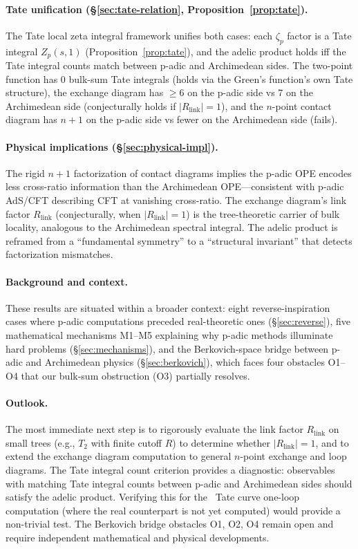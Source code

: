 \documentclass[11pt,a4paper]{article}
\begin{document}
\paragraph{Tate unification (\S\ref{sec:tate-relation}, Proposition~\ref{prop:tate}).}
The Tate local zeta integral framework unifies both cases: each $\zeta_p$ factor is a Tate integral $Z_p(s, 1)$ (Proposition~\ref{prop:tate}), and the adelic product holds iff the Tate integral counts match between p-adic and Archimedean sides. The two-point function has 0 bulk-sum Tate integrals (holds via the Green's function's own Tate structure), the exchange diagram has $\geq 6$ on the p-adic side vs 7 on the Archimedean side (conjecturally holds if $|R_{\mathrm{link}}| = 1$), and the $n$-point contact diagram has $n{+}1$ on the p-adic side vs fewer on the Archimedean side (fails).

\paragraph{Physical implications (\S\ref{sec:physical-impl}).}
The rigid $n{+}1$ factorization of contact diagrams implies the p-adic OPE encodes less cross-ratio information than the Archimedean OPE---consistent with p-adic AdS/CFT describing CFT at vanishing cross-ratio. The exchange diagram's link factor $R_{\mathrm{link}}$ (conjecturally, when $|R_{\mathrm{link}}| = 1$) is the tree-theoretic carrier of bulk locality, analogous to the Archimedean spectral integral. The adelic product is reframed from a ``fundamental symmetry'' to a ``structural invariant'' that detects factorization mismatches.

\paragraph{Background and context.}
These results are situated within a broader context: eight reverse-inspiration cases where p-adic computations preceded real-theoretic ones (\S\ref{sec:reverse}), five mathematical mechanisms M1--M5 explaining why p-adic methods illuminate hard problems (\S\ref{sec:mechanisms}), and the Berkovich-space bridge between p-adic and Archimedean physics (\S\ref{sec:berkovich}), which faces four obstacles O1--O4 that our bulk-sum obstruction (O3) partially resolves.

\paragraph{Outlook.}
The most immediate next step is to rigorously evaluate the link factor $R_{\mathrm{link}}$ on small trees (e.g., $T_2$ with finite cutoff $R$) to determine whether $|R_{\mathrm{link}}| = 1$, and to extend the exchange diagram computation to general $n$-point exchange and loop diagrams. The Tate integral count criterion provides a diagnostic: observables with matching Tate integral counts between p-adic and Archimedean sides should satisfy the adelic product. Verifying this for the~\cite{HJ24} Tate curve one-loop computation (where the real counterpart is not yet computed) would provide a non-trivial test. The Berkovich bridge obstacles O1, O2, O4 remain open and require independent mathematical and physical developments.
\end{document}
